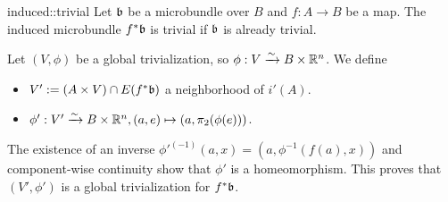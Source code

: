 \begin{mylemma}{induced::trivial}
    Let $\mathfrak{b}$ be a microbundle over $B$ and $f: A \to B$ be a map.
    The induced microbundle $f^*\mathfrak{b}$ is trivial if $\mathfrak{b}$ is already trivial.
\end{mylemma}
\begin{myproof}
Let $(V, \phi)$ be a global trivialization, so $\phi: V \xrightarrow{\sim} B \times \mathbb{R}^n$.
We define
\begin{itemize}
    \item $V' := (A \times V) \cap E(f^*\mathfrak{b})$ a neighborhood of $i'(A)$.
    \item $\phi': V' \xrightarrow{\sim} B \times \mathbb{R}^n, (a, e) \mapsto (a, \pi_2(\phi(e)))$.
\end{itemize}
The existence of an inverse $\phi'^{(-1)}(a, x) = (a, \phi^{-1}(f(a), x))$ and component-wise continuity show that $\phi'$ is a homeomorphism.
This proves that $(V', \phi')$ is a global trivialization for $f^*\mathfrak{b}$. 
\end{myproof}
